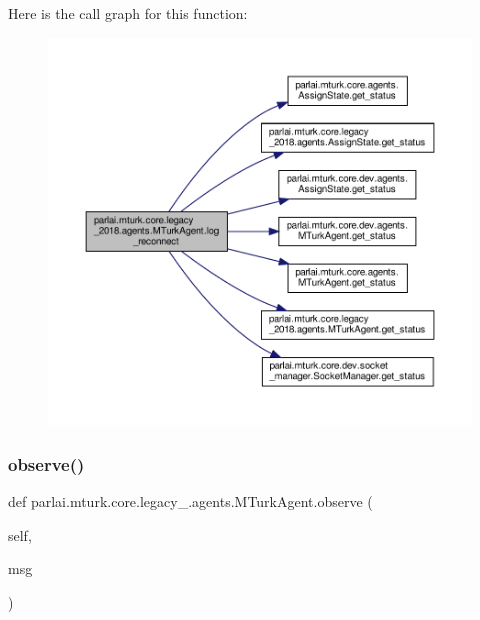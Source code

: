 Here is the call graph for this function\+:
\nopagebreak
\begin{figure}[H]
\begin{center}
\leavevmode
\includegraphics[width=350pt]{classparlai_1_1mturk_1_1core_1_1legacy__2018_1_1agents_1_1MTurkAgent_affe73b112be62cb32e0f8122c5f030fd_cgraph}
\end{center}
\end{figure}
\mbox{\label{classparlai_1_1mturk_1_1core_1_1legacy__2018_1_1agents_1_1MTurkAgent_ac974df04c688a98380b47bd12f412e4d}} 
\subsubsection{\texorpdfstring{observe()}{observe()}}
{\footnotesize\ttfamily def parlai.\+mturk.\+core.\+legacy\+\_.\+agents.\+M\+Turk\+Agent.\+observe (\begin{DoxyParamCaption}\item[{}]{self,  }\item[{}]{msg }\end{DoxyParamCaption})}

